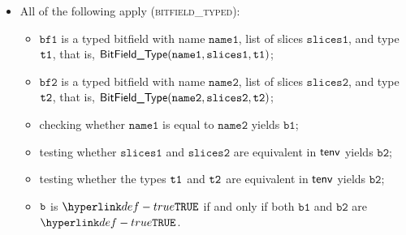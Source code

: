 \documentclass{book}
\newcommand\ProseOrTypeError[0]{\ProseTerminateAs{\TypeErrorConfig}}
\newcommand\bfone[0]{\texttt{bf1}}
\newcommand\bftwo[0]{\texttt{bf2}}
\newcommand\vbone[0]{\texttt{b1}}
\newcommand\vbtwo[0]{\texttt{b2}}
\newcommand\nameone[0]{\texttt{name1}}
\newcommand\nametwo[0]{\texttt{name2}}
\newcommand\slicesone[0]{\texttt{slices1}}
\newcommand\slicestwo[0]{\texttt{slices2}}
\begin{document}
\begin{itemize}
  \item All of the following apply (\textsc{bitfield\_typed}):
  \begin{itemize}
    \item $\bfone$ is a typed bitfield with name $\nameone$, list of slices $\slicesone$, and type $\texttt{t1}$, that is,
          $\BitFieldType(\nameone, \slicesone, \vtone)$;
    \item $\bftwo$ is a typed bitfield with name $\nametwo$, list of slices $\slicestwo$, and type $\texttt{t2}$, that is,
          $\BitFieldType(\nametwo, \slicestwo, \vttwo)$;
    \item checking whether $\nameone$ is equal to $\nametwo$ yields $\vbone$;
    \item testing whether $\slicesone$ and $\slicestwo$ are equivalent in $\textsf{tenv}$ yields $\vbtwo$\ProseOrTypeError;
    \item testing whether the types $\texttt{t1}$ and $\texttt{t2}$ are equivalent in $\textsf{tenv}$ yields $\vbtwo$\ProseOrTypeError;
    \item $\texttt{b}$ is $\True$ if and only if both $\vbone$ and $\vbtwo$ are $\True$.
  \end{itemize}
\end{itemize}
\end{document}
